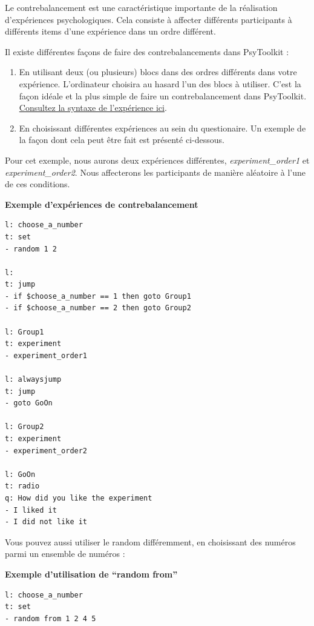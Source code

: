 \documentclass[
]{book}
\providecommand{\tightlist}{%
  \setlength{\itemsep}{0pt}\setlength{\parskip}{0pt}}
\begin{document}
Le contrebalancement est une caractéristique importante de la
réalisation d'expériences psychologiques. Cela consiste à affecter
différents participants à différents items d'une expérience dans un
ordre différent.

Il existe différentes façons de faire des contrebalancements dans
PsyToolkit :

\begin{enumerate}
\def\labelenumi{\arabic{enumi}.}
\tightlist
\item
  En utilisant deux (ou plusieurs) blocs dans des ordres différents dans
  votre expérience. L'ordinateur choisira au hasard l'un des blocs à
  utiliser. C'est la façon idéale et la plus simple de faire un
  contrebalancement dans PsyToolkit.
  \protect\hyperlink{blockorder}{Consultez la syntaxe de l'expérience
  ici}.
\item
  En choisissant différentes expériences au sein du questionaire. Un
  exemple de la façon dont cela peut être fait est présenté ci-dessous.
\end{enumerate}

Pour cet exemple, nous aurons deux expériences différentes,
\emph{experiment\_order1} et \emph{experiment\_order2}. Nous affecterons
les participants de manière aléatoire à l'une de ces conditions.

\textbf{Exemple d'expériences de contrebalancement}

\begin{verbatim}
l: choose_a_number
t: set
- random 1 2

l:
t: jump
- if $choose_a_number == 1 then goto Group1
- if $choose_a_number == 2 then goto Group2

l: Group1
t: experiment
- experiment_order1

l: alwaysjump
t: jump
- goto GoOn

l: Group2
t: experiment
- experiment_order2

l: GoOn
t: radio
q: How did you like the experiment
- I liked it
- I did not like it
\end{verbatim}

Vous pouvez aussi utiliser le random différemment, en choisissant des
numéros parmi un ensemble de numéros :

\textbf{Exemple d'utilisation de ``random from''}

\begin{verbatim}
l: choose_a_number
t: set
- random from 1 2 4 5
\end{verbatim}
\end{document}
